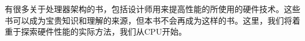 有很多关于处理器架构的书，包括设计师用来提高性能的所使用的硬件技术。这些书可以成为宝贵知识和理解的来源，但本书不会再成为这样的书。这里，我们将着重于探索硬件性能的实际方法，我们从CPU开始。














































